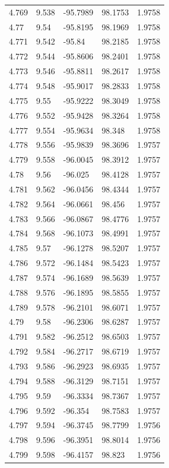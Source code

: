 \begin{tabular}{lllll}
4.769 & 9.538 & -95.7989 & 98.1753 & 1.9758 \\
4.77 & 9.54 & -95.8195 & 98.1969 & 1.9758 \\
4.771 & 9.542 & -95.84 & 98.2185 & 1.9758 \\
4.772 & 9.544 & -95.8606 & 98.2401 & 1.9758 \\
4.773 & 9.546 & -95.8811 & 98.2617 & 1.9758 \\
4.774 & 9.548 & -95.9017 & 98.2833 & 1.9758 \\
4.775 & 9.55 & -95.9222 & 98.3049 & 1.9758 \\
4.776 & 9.552 & -95.9428 & 98.3264 & 1.9758 \\
4.777 & 9.554 & -95.9634 & 98.348 & 1.9758 \\
4.778 & 9.556 & -95.9839 & 98.3696 & 1.9757 \\
4.779 & 9.558 & -96.0045 & 98.3912 & 1.9757 \\
4.78 & 9.56 & -96.025 & 98.4128 & 1.9757 \\
4.781 & 9.562 & -96.0456 & 98.4344 & 1.9757 \\
4.782 & 9.564 & -96.0661 & 98.456 & 1.9757 \\
4.783 & 9.566 & -96.0867 & 98.4776 & 1.9757 \\
4.784 & 9.568 & -96.1073 & 98.4991 & 1.9757 \\
4.785 & 9.57 & -96.1278 & 98.5207 & 1.9757 \\
4.786 & 9.572 & -96.1484 & 98.5423 & 1.9757 \\
4.787 & 9.574 & -96.1689 & 98.5639 & 1.9757 \\
4.788 & 9.576 & -96.1895 & 98.5855 & 1.9757 \\
4.789 & 9.578 & -96.2101 & 98.6071 & 1.9757 \\
4.79 & 9.58 & -96.2306 & 98.6287 & 1.9757 \\
4.791 & 9.582 & -96.2512 & 98.6503 & 1.9757 \\
4.792 & 9.584 & -96.2717 & 98.6719 & 1.9757 \\
4.793 & 9.586 & -96.2923 & 98.6935 & 1.9757 \\
4.794 & 9.588 & -96.3129 & 98.7151 & 1.9757 \\
4.795 & 9.59 & -96.3334 & 98.7367 & 1.9757 \\
4.796 & 9.592 & -96.354 & 98.7583 & 1.9757 \\
4.797 & 9.594 & -96.3745 & 98.7799 & 1.9756 \\
4.798 & 9.596 & -96.3951 & 98.8014 & 1.9756 \\
4.799 & 9.598 & -96.4157 & 98.823 & 1.9756 \\

\end{tabular}
